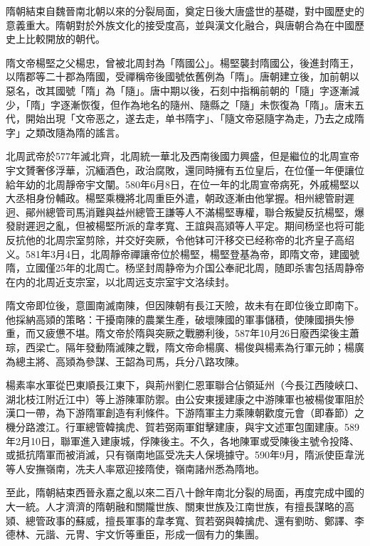 隋朝結束自魏晉南北朝以來的分裂局面，奠定日後大唐盛世的基礎，對中國歷史的意義重大。隋朝對於外族文化的接受度高，並與漢文化融合，與唐朝合為在中國歷史上比較開放的朝代。

隋文帝楊堅之父楊忠，曾被北周封為「隋國公」。楊堅襲封隋國公，後進封隋王，以隋郡等二十郡為隋國，受禪稱帝後國號依舊例為「隋」。唐朝建立後，加前朝以惡名，改其國號「隋」為「隨」。唐中期以後，石刻中指稱前朝的「隨」字逐漸減少，「隋」字逐漸恢復，但作為地名的隨州、隨縣之「隨」未恢復為「隋」。唐末五代，開始出現「文帝恶之，遂去走，单书隋字」、「隨文帝惡隨字為走，乃去之成隋字」之類改隨為隋的謠言。

北周武帝於577年滅北齊，北周統一華北及西南後國力興盛，但是繼位的北周宣帝宇文贇奢侈浮華，沉緬酒色，政治腐敗，還同時擁有五位皇后，在位僅一年便讓位給年幼的北周靜帝宇文闡。580年6月8日，在位一年的北周宣帝病死，外戚楊堅以大丞相身份輔政。楊堅乘機將北周重臣外遣，朝政逐漸由他掌握。相州總管尉遲迥、鄖州總管司馬消難與益州總管王謙等人不滿楊堅專權，聯合叛變反抗楊堅，爆發尉遲迥之亂，但被楊堅所派的韋孝寬、王誼與高熲等人平定。期间杨坚也将可能反抗他的北周宗室剪除，并交好突厥，令他钵可汗移交已经称帝的北齐皇子高绍义。581年3月4日，北周靜帝禪讓帝位於楊堅，楊堅登基為帝，即隋文帝，建國號隋，立國僅25年的北周亡。杨坚封周静帝为介国公奉祀北周，随即杀害包括周静帝在内的北周近支宗室，以北周远支宗室宇文洛续封。

隋文帝即位後，意圖南滅南陳，但因陳朝有長江天險，故未有在即位後立即南下。他採納高熲的策略：干擾南陳的農業生產，破壞陳國的軍事儲積，使陳國損失慘重，而又疲憊不堪。隋文帝於隋與突厥之戰勝利後，587年10月26日廢西梁後主蕭琮，西梁亡。隔年發動隋滅陳之戰，隋文帝命楊廣、楊俊與楊素為行軍元帥；楊廣為總主將、高熲為參謀、王韶為司馬，兵分八路攻陳。

楊素率水軍從巴東順長江東下，與荊州劉仁恩軍聯合佔領延州（今長江西陵峽口、湖北枝江附近江中）等上游陳軍防禦。由公安東援建康之中游陳軍也被楊俊軍阻於漢口一帶，為下游隋軍創造有利條件。下游隋軍主力乘陳朝歡度元會（即春節）之機分路渡江。行軍總管韓擒虎、賀若弼兩軍鉗擊建康，與宇文述軍包圍建康。589年2月10日，聯軍進入建康城，俘陳後主。不久，各地陳軍或受陳後主號令投降、或抵抗隋軍而被消滅，只有嶺南地區受冼夫人保境據守。590年9月，隋派使臣韋洸等人安撫嶺南，冼夫人率眾迎接隋使，嶺南諸州悉為隋地。

至此，隋朝結束西晉永嘉之亂以來二百八十餘年南北分裂的局面，再度完成中國的大一統。人才濟濟的隋朝融和關隴世族、關東世族及江南世族，有擅長謀略的高熲、總管政事的蘇威，擅長軍事的韋孝寬、賀若弼與韓擒虎、還有劉昉、鄭譯、李德林、元諧、元冑、宇文忻等重臣，形成一個有力的集團。

